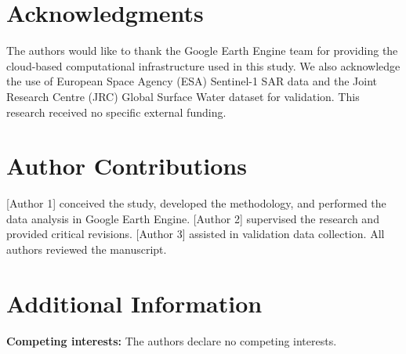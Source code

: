 \documentclass[fleqn,10pt]{article}
\begin{document}
\section*{Acknowledgments}
The authors would like to thank the Google Earth Engine team for providing the cloud-based computational infrastructure used in this study. We also acknowledge the use of European Space Agency (ESA) Sentinel-1 SAR data and the Joint Research Centre (JRC) Global Surface Water dataset for validation. This research received no specific external funding.


\section*{Author Contributions}
[Author 1] conceived the study, developed the methodology, and performed the data analysis in Google Earth Engine. [Author 2] supervised the research and provided critical revisions. [Author 3] assisted in validation data collection. All authors reviewed the manuscript.

\section*{Additional Information}
\textbf{Competing interests:} The authors declare no competing interests.



\end{document}
